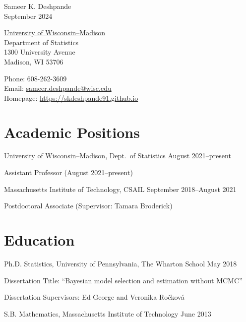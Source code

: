 \documentclass[10pt]{article}
\renewenvironment{itemize}{
  \begin{list}{}{
    \setlength{\leftmargin}{1.5em}
  }
}{
  \end{list}
}
\begin{document}
\begin{center}
{ \Large Sameer K. Deshpande } \\
September 2024
\end{center}

\begin{minipage}{0.4\linewidth}
  \href{http://www.wisc.edu}{University of Wisconsin--Madison} \\
  Department of Statistics \\
  1300 University Avenue \\
  Madison, WI 53706
\end{minipage}
\hfill
\begin{minipage}{0.42\linewidth}
Phone: 608-262-3609 \\
Email: \url{sameer.deshpande@wisc.edu} \\
Homepage: \url{https://skdeshpande91.github.io}
\end{minipage}

\section*{Academic Positions}
\begin{itemize}
\item{University of Wisconsin--Madison, Dept.\ of Statistics \hfill August 2021--present}
\begin{itemize}
\item{Assistant Professor (August 2021--present)}
\end{itemize}
\item{Massachusetts Institute of Technology, CSAIL \hfill September 2018--August 2021}
\begin{itemize}
\item{Postdoctoral Associate (Supervisor: Tamara Broderick)}
\end{itemize}
\end{itemize}

\section*{Education}
\begin{itemize}
\item{Ph.D. Statistics, University of Pennsylvania, The Wharton School \hfill May 2018}
\begin{itemize}
\item{Dissertation Title: ``Bayesian model selection and estimation without MCMC''}
\item{Dissertation Supervisors: Ed George and Veronika Ro\v{c}kov\'{a}}
\end{itemize}
\item{S.B. Mathematics, Massachusetts Institute of Technology \hfill June 2013}
\end{itemize}
\end{document}
